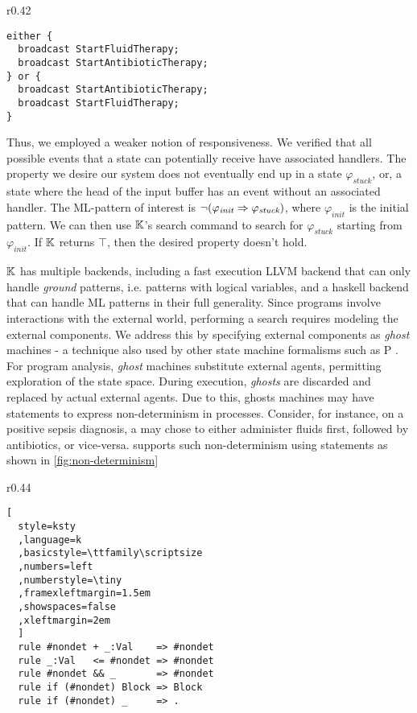 \begin{wrapfigure}{r}{0.42\textwidth}
\begin{lstlisting}[style=mediksty
,language=medik
,basicstyle=\ttfamily\scriptsize
,numberstyle=\tiny
,framexleftmargin=1.5em
,xleftmargin=2em
]
either {
  broadcast StartFluidTherapy;
  broadcast StartAntibioticTherapy;
} or {
  broadcast StartAntibioticTherapy;
  broadcast StartFluidTherapy;
}
\end{lstlisting}
  \caption{Non-determinism in \MediK{} Ghosts}\label{fig:non-determinism}
\end{wrapfigure}

Thus, we employed a weaker notion of responsiveness. We verified that all
possible events that a state can potentially receive have associated handlers.
The property we desire our system does not eventually end up in a
state $\varphi_{\textit{stuck}}$, or,
a state where the head of the input buffer has an event without
an associated handler. The ML-pattern of interest is $\neg(\varphi_\textit{init} \Rightarrow
\varphi_{\textit{stuck}})$, where $\varphi_\textit{init}$ is the initial pattern.
We can then use $\mathbb{K}$'s search command to search for $\varphi_{\textit{stuck}}$
starting from $\varphi_{\textit{init}}$. If $\mathbb{K}$ returns $\top$, then the
desired property doesn't hold.

$\mathbb{K}$ has multiple backends, including a fast execution LLVM backend
that can only handle \emph{ground} patterns, i.e. patterns with logical
variables, and a haskell backend that can handle ML patterns in their
full generality. Since \MediK{} programs involve interactions with
the external world, performing a search requires modeling the external
components. We address this by specifying external components
as \emph{ghost} machines - a technique also used by other state machine
formalisms such as P \cite{DesaiPLDI13}.
For program analysis, \emph{ghost} machines substitute external agents,
permitting exploration of the state space.
During execution, \emph{ghosts} are discarded and replaced by actual external agents.
Due to this, ghosts machines may have statements to express non-determinism
in processes. Consider, for instance, on a positive sepsis diagnosis, a
\HCP{} may chose to either administer fluids first, followed by antibiotics, or
vice-versa. \MediK{} supports such non-determinism using 
statements as shown in \figurename{} \ref{fig:non-determinism}

\begin{wrapfigure}{r}{0.44\textwidth}
\begin{lstlisting}[
  style=ksty
  ,language=k
  ,basicstyle=\ttfamily\scriptsize
  ,numbers=left
  ,numberstyle=\tiny
  ,framexleftmargin=1.5em
  ,showspaces=false
  ,xleftmargin=2em
  ]
  rule #nondet + _:Val    => #nondet
  rule _:Val   <= #nondet => #nondet
  rule #nondet && _       => #nondet
  rule if (#nondet) Block => Block
  rule if (#nondet) _     => .
\end{lstlisting}
  \caption{Abstract Semantics}\label{fig:abstract-semantics}
\end{wrapfigure}

